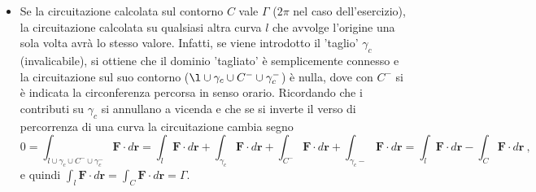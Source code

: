 \begin{enumerate}
\begin{itemize}
\item
 Se la circuitazione calcolata sul contorno $C$ vale $\Gamma$ ($2\pi$ nel caso dell'esercizio), la
 circuitazione calcolata su qualsiasi altra curva $l$ che avvolge l'origine una sola volta avrà lo stesso valore.
 Infatti, se viene introdotto il 'taglio' $\gamma_c$ (invalicabile), si ottiene che il dominio 'tagliato' è
 semplicemente connesso e la circuitazione sul suo contorno ($\l \cup \gamma_c \cup C^- \cup \gamma_c^- $) è
 nulla, dove con $C^-$ si è indicata la circonferenza percorsa in senso orario. Ricordando che i contributi su $
 \gamma_c$ si annullano a
 vicenda e che se si inverte il verso di percorrenza di una curva la circuitazione cambia segno
\begin{equation}
 0 = \int_{l \cup \gamma_c \cup C^- \cup \gamma_c^- } \bm{F} \cdot d\bm{r} = 
 \int_{l} \bm{F} \cdot d\bm{r} + \int_{\gamma_c} \bm{F} \cdot d\bm{r} +
 \int_{C^-} \bm{F} \cdot d\bm{r} + \int_{\gamma_c-} \bm{F} \cdot d\bm{r} = 
 \int_{l} \bm{F} \cdot d\bm{r} - \int_{C} \bm{F} \cdot d\bm{r} \ ,
\end{equation}
%
e quindi $ \int_{l} \bm{F} \cdot d\bm{r} = \int_{C} \bm{F} \cdot d\bm{r} = \Gamma $.
%
\vspace{-0.5cm}
\begin{figure}[h!]
\centering
 \qquad
{} \qquad
{}
\end{figure}


\end{itemize}
\end{enumerate}
